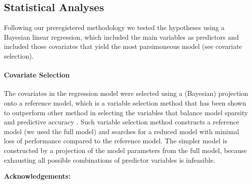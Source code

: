 \documentclass[12pt]{article}
\begin{document}
\subsection*{Statistical Analyses}
Following our preregistered methodology we tested the hypotheses using a Bayesian linear regression, which included the main variables as predictors and included those covariates that yield the most parsimoneous model (see covariate selection).
\paragraph*{Covariate Selection}
The covariates in the regression model were selected using a (Bayesian) projection onto a reference model, which is a variable selection method that has been shown to outperform other method in selecting the variables that balance model sparsity and predictive accuracy \cite{Pavone2020UsingSelection, Piironen2020ProjectiveSelection}. Such variable selection method constructs a reference model (we used the full model) and searches for a reduced model with minimal loss of performance compared to the reference model. The simpler model is constructed by a projection of the model parameters from the full model, because exhausting all possible combinations of predictor variables is infeasible.








\noindent \textbf{Acknowledgements:} 
%
\end{document}
